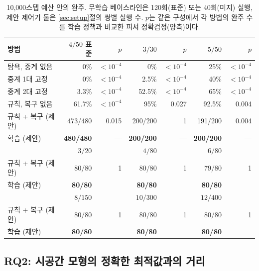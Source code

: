 \documentclass[final,5p,times,twocolumn]{elsarticle}
\begin{document}
\begin{table}[t]
\centering
\caption{10{,}000스텝 예산 안의 완주. 무학습 베이스라인은 120회(표준) 또는 40회(미지) 실행, 제안
제어기 둘은 \ref{sec:setup}절의 쌍별 실행 수. $p$는 같은 구성에서 각 방법의 완주 수를 학습 정책과
비교한 피셔 정확검정(양측)이다.}
\label{tab:completion}
\scriptsize
\setlength{\tabcolsep}{2.2pt}
\begin{tabular}{lrrrrrr}
\toprule
방법 & $4/50$ 표준 & $p$ & $3/30$ & $p$ & $5/50$ & $p$ \\
\midrule
탐욕, 중계 없음 & 0\% & $<10^{-4}$ & 0\% & $<10^{-4}$ & 25\% & $<10^{-4}$ \\
중계 1대 고정 & 0\% & $<10^{-4}$ & 2.5\% & $<10^{-4}$ & 40\% & $<10^{-4}$ \\
중계 2대 고정 & 3.3\% & $<10^{-4}$ & 52.5\% & $<10^{-4}$ & 65\% & $<10^{-4}$ \\
규칙, 복구 없음 & 61.7\% & $<10^{-4}$ & 95\% & 0.027 & 92.5\% & 0.004 \\
규칙 + 복구 (제안) & 473/480 & 0.015 & 200/200 & 1 & 191/200 & 0.004 \\
학습 (제안) & \textbf{480/480} & --- & \textbf{200/200} & --- & \textbf{200/200} & --- \\
\midrule
 & $3/20$ & & $4/80$ & & $6/80$ & \\
규칙 + 복구 (제안) & 80/80 & 1 & 80/80 & 1 & 79/80 & 1 \\
학습 (제안) & \textbf{80/80} & & \textbf{80/80} & & \textbf{80/80} & \\
\midrule
 & $8/150$ & & $10/300$ & & $12/400$ & \\
규칙 + 복구 (제안) & 80/80 & 1 & 80/80 & 1 & 80/80 & 1 \\
학습 (제안) & \textbf{80/80} & & \textbf{80/80} & & \textbf{80/80} & \\
\bottomrule
\end{tabular}
\end{table}

\subsection{RQ2: 시공간 모형의 정확한 최적값과의 거리}
\label{sec:rq2}
\end{document}
